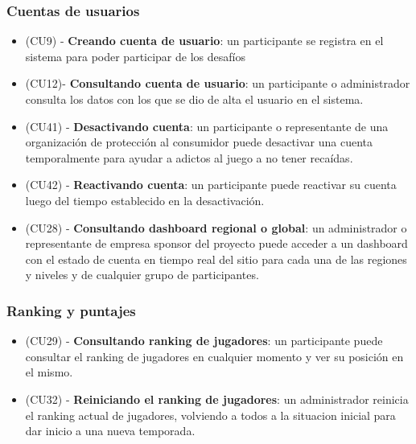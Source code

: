 \subsubsection{Cuentas de usuarios}
\begin{itemize}
\item (CU9) -  \textbf{Creando cuenta de usuario}: un participante se registra en el sistema para poder participar de los desafíos
\item (CU12)-  \textbf{Consultando cuenta de usuario}: un participante o administrador consulta los datos con los que se dio de alta el usuario en el sistema.
\item (CU41) - \textbf{Desactivando cuenta}: un participante o representante de una organización de protección al consumidor puede desactivar una cuenta temporalmente para ayudar a adictos al juego a no tener recaídas.
\item (CU42) - \textbf{Reactivando cuenta}: un participante puede reactivar su cuenta luego del tiempo establecido en la desactivación.
\item (CU28) -  \textbf{Consultando dashboard regional o global}: un administrador o representante de empresa sponsor del proyecto puede acceder a un dashboard con el estado de cuenta en tiempo real del sitio para cada una de las regiones y niveles y de cualquier grupo de participantes.
\end{itemize}

\subsubsection{Ranking y puntajes}

\begin{itemize}
\item (CU29) - \textbf{Consultando ranking de jugadores}: un participante puede consultar el ranking de jugadores en cualquier momento y ver su posición en el mismo.
\item (CU32) - \textbf{Reiniciando el ranking de jugadores}: un administrador reinicia el ranking actual de jugadores, volviendo a todos a la situacion inicial para dar inicio a una nueva temporada.
\end{itemize}


